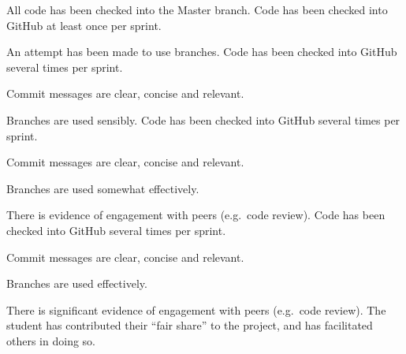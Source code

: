 \documentclass{../fal_assignment}
\begin{document}
\begin{markingrubric}
            \par All code has been checked into the Master branch.
        \grade Code has been checked into GitHub at least once per sprint.
            \par An attempt has been made to use branches.
        \grade Code has been checked into GitHub several times per sprint.
            \par Commit messages are clear, concise and relevant.
            \par Branches are used sensibly.
        \grade Code has been checked into GitHub several times per sprint.
            \par Commit messages are clear, concise and relevant.
            \par Branches are used somewhat effectively.
            \par There is evidence of engagement with peers (e.g.\ code review).
        \grade Code has been checked into GitHub several times per sprint.
            \par Commit messages are clear, concise and relevant.
            \par Branches are used effectively.
            \par There is significant evidence of engagement with peers (e.g.\ code review).
%
        \grade The student has contributed their ``fair share'' to the project,
            and has facilitated others in doing so.
\end{markingrubric}
\end{document}
